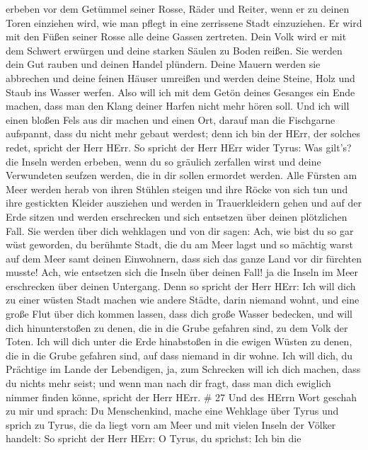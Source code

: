 erbeben vor dem Getümmel seiner Rosse, Räder und Reiter, wenn er zu
deinen Toren einziehen wird, wie man pflegt in eine zerrissene Stadt
einzuziehen.  Er wird mit den Füßen seiner Rosse alle deine
Gassen zertreten. Dein Volk wird er mit dem Schwert erwürgen und deine
starken Säulen zu Boden reißen.  Sie werden dein Gut rauben
und deinen Handel plündern. Deine Mauern werden sie abbrechen und deine
feinen Häuser umreißen und werden deine Steine, Holz und Staub ins
Wasser werfen.  Also will ich mit dem Getön deines Gesanges
ein Ende machen, dass man den Klang deiner Harfen nicht mehr hören soll.
 Und ich will einen bloßen Fels aus dir machen und einen
Ort, darauf man die Fischgarne aufspannt, dass du nicht mehr gebaut
werdest; denn ich bin der HErr, der solches redet, spricht der Herr
HErr.  So spricht der Herr HErr wider Tyrus: Was gilt's?
die Inseln werden erbeben, wenn du so gräulich zerfallen wirst und deine
Verwundeten seufzen werden, die in dir sollen ermordet werden.
 Alle Fürsten am Meer werden herab von ihren Stühlen
steigen und ihre Röcke von sich tun und ihre gestickten Kleider
ausziehen und werden in Trauerkleidern gehen und auf der Erde sitzen und
werden erschrecken und sich entsetzen über deinen plötzlichen Fall.
 Sie werden über dich wehklagen und von dir sagen: Ach, wie
bist du so gar wüst geworden, du berühmte Stadt, die du am Meer lagst
und so mächtig warst auf dem Meer samt deinen Einwohnern, dass sich das
ganze Land vor dir fürchten musste!  Ach, wie entsetzen
sich die Inseln über deinen Fall! ja die Inseln im Meer erschrecken über
deinen Untergang.  Denn so spricht der Herr HErr: Ich will
dich zu einer wüsten Stadt machen wie andere Städte, darin niemand
wohnt, und eine große Flut über dich kommen lassen, dass dich große
Wasser bedecken,  und will dich hinunterstoßen zu denen,
die in die Grube gefahren sind, zu dem Volk der Toten. Ich will dich
unter die Erde hinabstoßen in die ewigen Wüsten zu denen, die in die
Grube gefahren sind, auf dass niemand in dir wohne. Ich will dich, du
Prächtige im Lande der Lebendigen,  ja, zum Schrecken will
ich dich machen, dass du nichts mehr seist; und wenn man nach dir fragt,
dass man dich ewiglich nimmer finden könne, spricht der Herr HErr. \# 27
 Und des HErrn Wort geschah zu mir und sprach: 
Du Menschenkind, mache eine Wehklage über Tyrus  und sprich
zu Tyrus, die da liegt vorn am Meer und mit vielen Inseln der Völker
handelt: So spricht der Herr HErr: O Tyrus, du sprichst: Ich bin die
